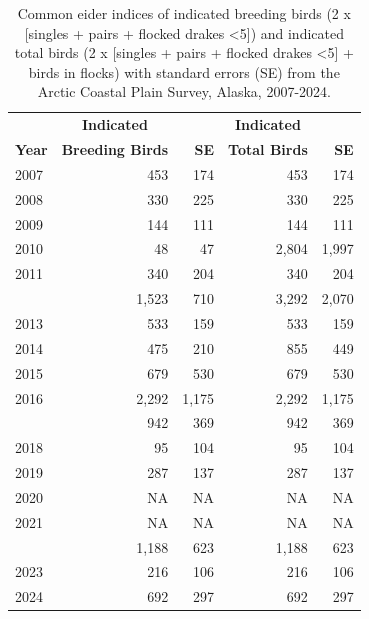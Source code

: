\documentclass[
]{article}
\begin{document}
\begingroup\fontsize{10}{12}\selectfont

\begin{longtable}[t]{lrrrr}

\caption{\label{tbl-COEI}Common eider indices of indicated breeding
birds (2 x {[}singles + pairs + flocked drakes \textless5{]}) and
indicated total birds (2 x {[}singles + pairs + flocked drakes
\textless5{]} + birds in flocks) with standard errors (SE) from the
Arctic Coastal Plain Survey, Alaska, 2007-2024.}

\tabularnewline

\\
\toprule
\multicolumn{1}{c}{\textbf{ }} & \multicolumn{1}{c}{\textbf{Indicated}} & \multicolumn{1}{c}{\textbf{ }} & \multicolumn{1}{c}{\textbf{Indicated}} & \multicolumn{1}{c}{\textbf{ }} \\
\cmidrule(l{3pt}r{3pt}){2-2} \cmidrule(l{3pt}r{3pt}){4-4}
\textbf{Year} & \textbf{Breeding Birds} & \textbf{SE} & \textbf{Total Birds} & \textbf{SE}\\
\midrule
2007 & 453 & 174 & 453 & 174\\
2008 & 330 & 225 & 330 & 225\\
2009 & 144 & 111 & 144 & 111\\
2010 & 48 & 47 & 2,804 & 1,997\\
2011 & 340 & 204 & 340 & 204\\
\addlinespace
2012 & 1,523 & 710 & 3,292 & 2,070\\
2013 & 533 & 159 & 533 & 159\\
2014 & 475 & 210 & 855 & 449\\
2015 & 679 & 530 & 679 & 530\\
2016 & 2,292 & 1,175 & 2,292 & 1,175\\
\addlinespace
2017 & 942 & 369 & 942 & 369\\
2018 & 95 & 104 & 95 & 104\\
2019 & 287 & 137 & 287 & 137\\
2020 & NA & NA & NA & NA\\
2021 & NA & NA & NA & NA\\
\addlinespace
2022 & 1,188 & 623 & 1,188 & 623\\
2023 & 216 & 106 & 216 & 106\\
2024 & 692 & 297 & 692 & 297\\
\bottomrule

\end{longtable}

\endgroup{}
\end{document}

